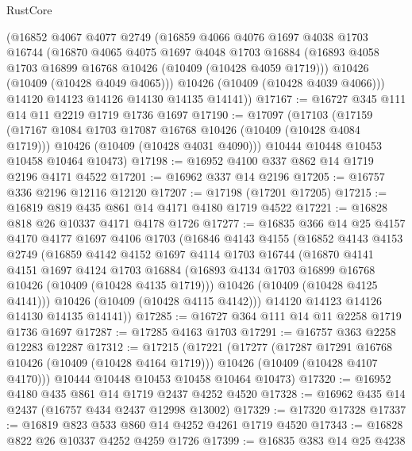 \begin{lexlean}{RustCore}
\begin{coremodule}
      (@16852
        @4067
        @4077
        @2749
        (@16859
          @4066
          @4076
          @1697
          @4038
          @1703
          @16744
          (@16870
            @4065
            @4075
            @1697
            @4048
            @1703
            @16884
            (@16893 @4058 @1703 @16899 @16768 @10426 (@10409 (@10428 @4059 @1719)))
            @10426
            (@10409 (@10428 @4049 @4065)))
          @10426
          (@10409 (@10428 @4039 @4066)))
        @14120
        @14123
        @14126
        @14130
        @14135
        @14141))
@17167 := @16727 @345 @111 @14 @11 @2219 @1719 @1736 @1697
@17190 := @17097
    (@17103
      (@17159
        (@17167 @1084 @1703 @17087 @16768 @10426 (@10409 (@10428 @4084 @1719)))
        @10426
        (@10409 (@10428 @4031 @4090)))
      @10444
      @10448
      @10453
      @10458
      @10464
      @10473)
@17198 := @16952 @4100 @337 @862 @14 @1719 @2196 @4171 @4522
@17201 := @16962 @337 @14 @2196
@17205 := @16757 @336 @2196 @12116 @12120
@17207 := @17198 (@17201 @17205)
@17215 := @16819 @819 @435 @861 @14 @4171 @4180 @1719 @4522
@17221 := @16828 @818 @26 @10337 @4171 @4178 @1726
@17277 := @16835
    @366
    @14
    @25
    @4157
    @4170
    @4177
    @1697
    @4106
    @1703
    (@16846
      @4143
      @4155
      (@16852
        @4143
        @4153
        @2749
        (@16859
          @4142
          @4152
          @1697
          @4114
          @1703
          @16744
          (@16870
            @4141
            @4151
            @1697
            @4124
            @1703
            @16884
            (@16893 @4134 @1703 @16899 @16768 @10426 (@10409 (@10428 @4135 @1719)))
            @10426
            (@10409 (@10428 @4125 @4141)))
          @10426
          (@10409 (@10428 @4115 @4142)))
        @14120
        @14123
        @14126
        @14130
        @14135
        @14141))
@17285 := @16727 @364 @111 @14 @11 @2258 @1719 @1736 @1697
@17287 := @17285 @4163 @1703
@17291 := @16757 @363 @2258 @12283 @12287
@17312 := @17215
    (@17221
      (@17277
        (@17287 @17291 @16768 @10426 (@10409 (@10428 @4164 @1719)))
        @10426
        (@10409 (@10428 @4107 @4170)))
      @10444
      @10448
      @10453
      @10458
      @10464
      @10473)
@17320 := @16952 @4180 @435 @861 @14 @1719 @2437 @4252 @4520
@17328 := @16962 @435 @14 @2437 (@16757 @434 @2437 @12998 @13002)
@17329 := @17320 @17328
@17337 := @16819 @823 @533 @860 @14 @4252 @4261 @1719 @4520
@17343 := @16828 @822 @26 @10337 @4252 @4259 @1726
@17399 := @16835
    @383
    @14
    @25
    @4238

\end{coremodule}
\end{lexlean}

